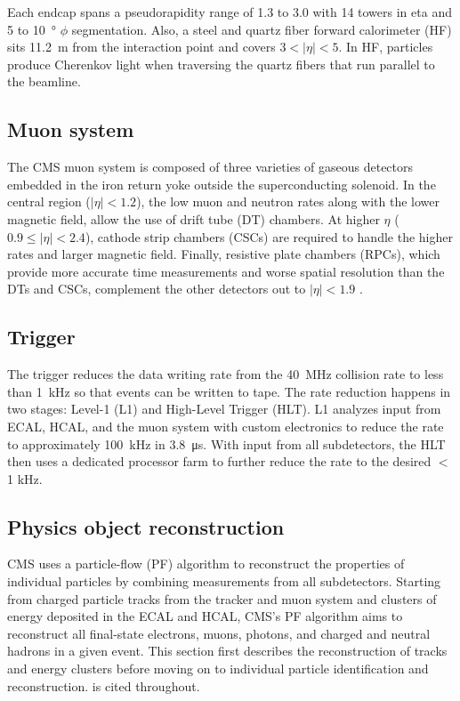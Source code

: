 Each endcap spans a pseudorapidity range of \num{1.3} to \num{3.0} with \num{14} towers in eta and \num{5} to \SI{10}{\degree} $\phi$ segmentation. Also, a steel and quartz fiber forward calorimeter (HF) sits \SI{11.2}{m} from the interaction point and covers $3<|\eta|<5$. In HF, particles produce Cherenkov light when traversing the quartz fibers that run parallel to the beamline.


\subsection{Muon system}
The CMS muon system is composed of three varieties of gaseous detectors embedded in the iron return yoke outside the superconducting solenoid. In the central region ($|\eta|<1.2$), the low muon and neutron rates along with the lower magnetic field, allow the use of drift tube (DT) chambers. At higher $\eta$ ($0.9\leq|\eta|<2.4$), cathode strip chambers (CSCs) are required to handle the higher rates and larger magnetic field. Finally, resistive plate chambers (RPCs), which provide more accurate time measurements and worse spatial resolution than the DTs and CSCs, complement the other detectors out to $|\eta|<1.9$ \cite{cms_tdr_v1, cms_ms_performance}. 

\subsection{Trigger}
\label{trigger}
The trigger reduces the data writing rate from the \SI{40}{\MHz} collision rate to less than \SI{1}{\kHz} so that events can be written to tape. The rate reduction happens in two stages: Level-1 (L1) and High-Level Trigger (HLT). L1 analyzes input from ECAL, HCAL, and the muon system with custom electronics to reduce the rate to approximately \SI{100}{\kHz} in \SI{3.8}{\us}. With input from all subdetectors, the HLT then uses a dedicated processor farm to further reduce the rate to the desired $<$ 1 kHz\cite{cms_experiment, cms_trigger_upgrade}.

\subsection{Physics object reconstruction}
CMS uses a particle-flow (PF) algorithm to reconstruct the properties of individual particles by combining measurements from all subdetectors. Starting from charged particle tracks from the tracker and muon system and clusters of energy deposited in the ECAL and HCAL, CMS's PF algorithm aims to reconstruct all final-state electrons, muons, photons, and charged and neutral hadrons in a given event. This section first describes the reconstruction of tracks and energy clusters before moving on to individual particle identification and reconstruction. \cite{cms_pf} is cited throughout.

